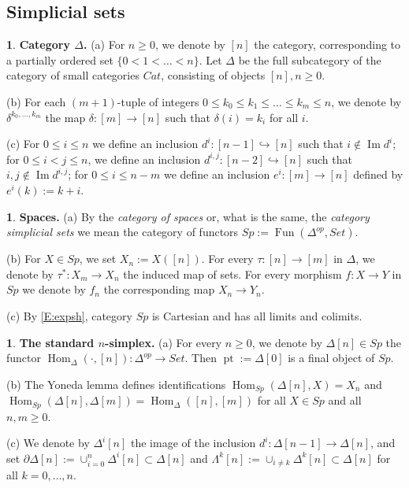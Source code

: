 \documentclass[12pt]{amsart}
\theoremstyle{plain}
\theoremstyle{definition}
\newtheorem{Emp}[Thm]{}
\numberwithin{equation}{section}
\newcommand{\La}{\Lambda}
\newcommand{\hra}{\hookrightarrow}
\newcommand{\dt}{\delta}
\newcommand{\Dt}{\Delta}
\newcommand{\re}[1]{\ref{E:#1}}
\newcommand{\im}{\operatorname{Im}}
\newcommand{\Fun}{\operatorname{Fun}}
\newcommand{\pt}{\operatorname{pt}}
\newcommand{\p}{\partial}
\newcommand{\Hom}{\operatorname{Hom}}
\begin{document}

\subsection{Simplicial sets}
\begin{Emp} \label{E:indcat}
{\bf Category $\Dt$.} (a) For $n\geq 0$, we denote by $[n]$ the
category, corresponding to a partially ordered set
$\{0<1<\ldots<n\}$. Let $\Dt$ be the full subcategory of the
category of small categories $Cat$, consisting of objects $[n],
n\geq 0$.

(b) For each $(m+1)$-tuple of integers $0\leq k_0\leq k_1\leq\ldots \leq k_m\leq n$, we denote by
$\dt^{k_0,\ldots,k_m}$ the map $\dt:[m]\to[n]$ such that
$\dt(i)=k_i$ for all $i$.

(c) For $0\leq i\leq n$ we define an inclusion $d^i:[n-1]\hra
[n]$ such that $i\notin\im d^i$; for $0\leq i<j\leq n$, we define an 
inclusion $d^{i,j}:[n-2]\hra [n]$ such that $i,j\notin\im d^{i,j}$;
for $0\leq i\leq n-m$ we define an inclusion $e^i:[m]\to[n]$
defined by $e^i(k):=k+i$.
\end{Emp}

\begin{Emp} \label{E:sp}
{\bf Spaces.} (a) By the {\em category of spaces} or, what is the same,
the {\em category simplicial sets} we mean the category of functors
$Sp:=\Fun(\Dt^{op},Set)$.

(b) For $X\in Sp$, we set $X_n:=X([n])$. For every
$\tau:[n]\to[m]$ in $\Dt$, we denote by  $\tau^*:X_m\to X_n$ the
induced map of sets. For every morphism $f:X\to Y$ in $Sp$ we
denote by $f_n$ the corresponding map $X_n\to Y_n$.%

(c) By \re{expsh}, category $Sp$ is Cartesian and has all limits
and colimits.
\end{Emp}

\begin{Emp} \label{E:stsym}
{\bf The standard $n$-simplex.} (a) For every $n\geq 0$, we denote
by $\Dt[n]\in Sp$ the functor $\Hom_{\Dt}(\cdot,[n]):\Dt^{op}\to
Set$. Then $\pt:=\Dt[0]$ is a
final object of $Sp$.

(b) The Yoneda lemma  defines identifications $\Hom_{Sp}(\Dt[n],X)=X_n$ and \\
$\Hom_{Sp}(\Dt[n],\Dt[m])=\Hom_{\Dt}([n],[m])$ for all $X\in Sp$ and all $n,m\geq 0$.

(c) We denote by $\Dt^i[n]$ the image of the inclusion
$d^i:\Dt[n-1]\to\Dt[n]$, and set $\p\Dt[n]:=\cup_{i=0}^n\Dt^i[n]\subset\Dt[n]$ 
and $\La^k[n]:=\cup_{i\neq k}\Dt^k[n]\subset\Dt[n]$ for all
$k=0,\ldots,n$.
\end{Emp}
\end{document}
